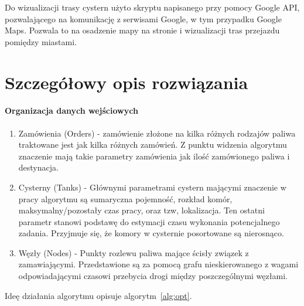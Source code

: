 \documentclass[11pt,a4paper,oneside]{mwart}
\begin{document}
Do wizualizacji trasy cystern użyto skryptu napisanego przy pomocy Google API, pozwalającego na komunikację z serwisami Google, w tym przypadku Google Maps. Pozwala to  na osadzenie mapy na stronie i wizualizacji tras przejazdu pomiędzy miastami.

\section{Szczegółowy opis rozwiązania}
 
\paragraph{Organizacja danych wejściowych}
\begin{enumerate}
  \item Zamówienia (Orders) - zamówienie złożone na kilka różnych rodzajów paliwa traktowane jest jak kilka różnych zamówień. Z punktu widzenia algorytmu znaczenie mają takie parametry zamówienia jak ilość zamówionego paliwa i destynacja.

  \item Cysterny (Tanks) - Głównymi parametrami cystern mającymi znaczenie w pracy algorytmu są sumaryczna pojemność, rozkład komór, maksymalny/pozostały czas pracy, oraz tzw, lokalizacja. Ten ostatni parametr stanowi podstawę do estymacji czasu wykonania potencjalnego zadania. Przyjmuje się, że komory  w cysternie posortowane są nierosnąco.


  \item Węzły (Nodes) - Punkty rozlewu paliwa mające ścisły związek z zamawiającymi. Przedstawione są za pomocą grafu nieskierowanego z wagami odpowiadającymi czasowi przebycia drogi między poszczególnymi węzłami.

\end{enumerate}

Ideę działania algorytmu opisuje algorytm~\ref{alg:opt}.
\end{document}
